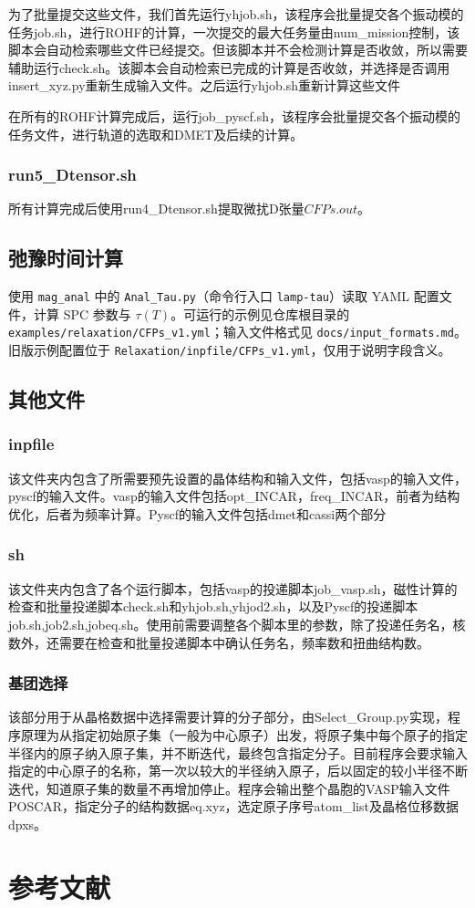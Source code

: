 \documentclass[UTF8]{ctexart}
\begin{document}
为了批量提交这些文件，我们首先运行yhjob.sh，该程序会批量提交各个振动模的任务job.sh，进行ROHF的计算，一次提交的最大任务量由num\_mission控制，该脚本会自动检索哪些文件已经提交。但该脚本并不会检测计算是否收敛，所以需要辅助运行check.sh。该脚本会自动检索已完成的计算是否收敛，并选择是否调用insert\_xyz.py重新生成输入文件。之后运行yhjob.sh重新计算这些文件

在所有的ROHF计算完成后，运行job\_pyscf.sh，该程序会批量提交各个振动模的任务文件，进行轨道的选取和DMET及后续的计算。

\subsubsection{run5\_Dtensor.sh}
所有计算完成后使用run4\_Dtensor.sh提取微扰D张量$CFPs.out$。

\subsection{弛豫时间计算}

使用 \texttt{mag\_anal} 中的 \texttt{Anal\_Tau.py}（命令行入口 \texttt{lamp-tau}）读取 YAML 配置文件，计算 SPC 参数与 \(\tau(T)\)。可运行的示例见仓库根目录的 \texttt{examples/relaxation/CFPs\_v1.yml}；输入文件格式见 \texttt{docs/input\_formats.md}。旧版示例配置位于 \texttt{Relaxation/inpfile/CFPs\_v1.yml}，仅用于说明字段含义。

\subsection{其他文件}

\subsubsection{inpfile}
该文件夹内包含了所需要预先设置的晶体结构和输入文件，包括vasp的输入文件，pyscf的输入文件。vasp的输入文件包括opt\_INCAR，freq\_INCAR，前者为结构优化，后者为频率计算。Pyscf的输入文件包括dmet和cassi两个部分
\subsubsection{sh}
该文件夹内包含了各个运行脚本，包括vasp的投递脚本job\_vasp.sh，磁性计算的检查和批量投递脚本check.sh和yhjob.sh,yhjod2.sh，以及Pyscf的投递脚本job.sh,job2.sh,jobeq.sh。使用前需要调整各个脚本里的参数，除了投递任务名，核数外，还需要在检查和批量投递脚本中确认任务名，频率数和扭曲结构数。


\subsubsection{基团选择}
该部分用于从晶格数据中选择需要计算的分子部分，由Select\_Group.py实现，程序原理为从指定初始原子集（一般为中心原子）出发，将原子集中每个原子的指定半径内的原子纳入原子集，并不断迭代，最终包含指定分子。目前程序会要求输入指定的中心原子的名称，第一次以较大的半径纳入原子，后以固定的较小半径不断迭代，知道原子集的数量不再增加停止。程序会输出整个晶胞的VASP输入文件POSCAR，指定分子的结构数据eq.xyz，选定原子序号atom\_list及晶格位移数据dpxs。






\section{参考文献}
\renewcommand\refname{}


\end{document}
